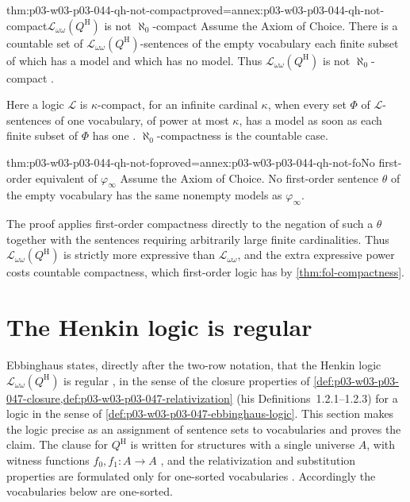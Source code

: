 \begin{hbcorollary}{thm:p03-w03-p03-044-qh-not-compact}{proved=annex:p03-w03-p03-044-qh-not-compact}{\(\mathscr L_{\omega\omega}(Q^{\mathrm H})\) is not \(\aleph_0\)-compact}
Assume the Axiom of Choice.  There is a countable set of
\(\mathscr L_{\omega\omega}(Q^{\mathrm H})\)-sentences of the empty
vocabulary each finite subset of which has a model and which has no model.
Thus \(\mathscr L_{\omega\omega}(Q^{\mathrm H})\) is not
\(\aleph_0\)-compact \cite[p.~39]{Ebbinghaus1985ExtendedLogics}.
\end{hbcorollary}

Here a logic \(\mathscr L\) is \(\kappa\)-compact, for an infinite cardinal
\(\kappa\), when every set \(\Phi\) of \(\mathscr L\)-sentences of one
vocabulary, of power at most \(\kappa\), has a model as soon as each finite
subset of \(\Phi\) has one
\cite[Ch.~II, Definition~1.2.4(i), p.~31]{Ebbinghaus1985ExtendedLogics}.
\(\aleph_0\)-compactness is the countable case.

\begin{hbcorollary}{thm:p03-w03-p03-044-qh-not-fo}{proved=annex:p03-w03-p03-044-qh-not-fo}{No first-order equivalent of \(\varphi_\infty\)}
Assume the Axiom of Choice.  No first-order sentence \(\theta\) of the empty
vocabulary has the same nonempty models as \(\varphi_\infty\).
\end{hbcorollary}

The proof applies first-order compactness directly to the negation of
such a \(\theta\) together with the sentences requiring arbitrarily
large finite cardinalities. Thus
\(\mathscr L_{\omega\omega}(Q^{\mathrm H})\) is strictly more expressive than
\(\mathscr L_{\omega\omega}\), and the extra expressive power costs
countable compactness, which first-order logic has by
\cref{thm:fol-compactness}.

\section{The Henkin logic is regular}
\label{sec:p03-w03-p03-044-regular}

Ebbinghaus states, directly after the two-row notation, that the Henkin logic
\(\mathscr L_{\omega\omega}(Q^{\mathrm H})\) is regular
\cite[p.~39]{Ebbinghaus1985ExtendedLogics}, in the sense of the closure
properties of \cref{def:p03-w03-p03-047-closure,def:p03-w03-p03-047-relativization}
(his Definitions~1.2.1--1.2.3) for a logic in the sense of
\cref{def:p03-w03-p03-047-ebbinghaus-logic}.  This section makes the logic
precise as an assignment of sentence sets to vocabularies and proves the
claim.  The clause for \(Q^{\mathrm H}\) is written for structures with a
single universe \(A\), with witness functions \(f_0,f_1:A\to A\)
\cite[p.~38]{Ebbinghaus1985ExtendedLogics}, and the relativization and
substitution properties are formulated only for one-sorted vocabularies
\cite[Ch.~II, p.~30]{Ebbinghaus1985ExtendedLogics}.  Accordingly the
vocabularies below are one-sorted.

